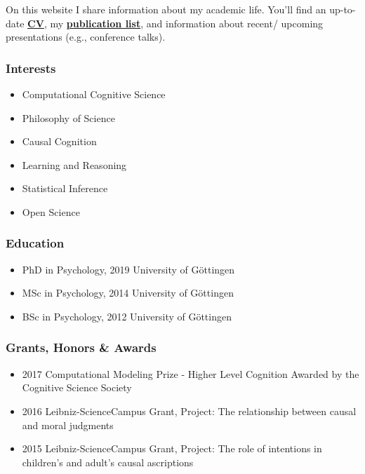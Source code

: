 \documentclass[
]{article}
\providecommand{\tightlist}{%
  \setlength{\itemsep}{0pt}\setlength{\parskip}{0pt}}
\begin{document}
On this website I share information about my academic life. You'll find
an up-to-date \textbf{\href{cv/simonstephan_cv.pdf}{CV}}, my
\textbf{\protect\hyperlink{publications}{publication list}}, and
information about recent/ upcoming presentations (e.g., conference
talks).

\hypertarget{interests}{%
\subsubsection{Interests}\label{interests}}

\begin{itemize}
\tightlist
\item
  Computational Cognitive Science
\item
  Philosophy of Science
\item
  Causal Cognition
\item
  Learning and Reasoning
\item
  Statistical Inference
\item
  Open Science
\end{itemize}

\hypertarget{education}{%
\subsubsection{Education}\label{education}}

\begin{itemize}
\tightlist
\item
  PhD in Psychology, 2019 University of Göttingen
\item
  MSc in Psychology, 2014 University of Göttingen
\item
  BSc in Psychology, 2012 University of Göttingen
\end{itemize}

\hypertarget{grants-honors-awards}{%
\subsubsection{Grants, Honors \& Awards}\label{grants-honors-awards}}

\begin{itemize}
\tightlist
\item
  2017 Computational Modeling Prize - Higher Level Cognition Awarded by
  the Cognitive Science Society
\item
  2016 Leibniz-ScienceCampus Grant, Project: The relationship between
  causal and moral judgments
\item
  2015 Leibniz-ScienceCampus Grant, Project: The role of intentions in
  children's and adult's causal ascriptions
\end{itemize}
\end{document}

